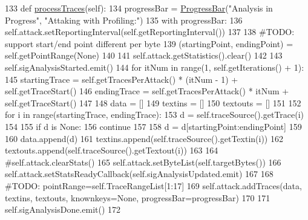 \begin{DoxyCode}
133     \textcolor{keyword}{def }\hyperlink{classsoftware_1_1chipwhisperer_1_1analyzer_1_1attacks_1_1profiling_1_1Profiling_a38c4ff6cc2be44c1f5656f866faa03d7}{processTraces}(self):
134         progressBar = \hyperlink{namespacesoftware_1_1chipwhisperer_1_1common_1_1ui_1_1ProgressBar_a378a399b50b3d116fc08a53eaa642148}{ProgressBar}(\textcolor{stringliteral}{"Analysis in Progress"}, \textcolor{stringliteral}{"Attaking with Profiling:"})
135         with progressBar:
136             self.attack.setReportingInterval(self.getReportingInterval())
137 
138             \textcolor{comment}{#TODO: support start/end point different per byte}
139             (startingPoint, endingPoint) = self.getPointRange(\textcolor{keywordtype}{None})
140 
141             self.attack.getStatistics().clear()
142 
143             self.sigAnalysisStarted.emit()
144             \textcolor{keywordflow}{for} itNum \textcolor{keywordflow}{in} range(1, self.getIterations() + 1):
145                 startingTrace = self.getTracesPerAttack() * (itNum - 1) + self.getTraceStart()
146                 endingTrace = self.getTracesPerAttack() * itNum + self.getTraceStart()
147 
148                 data = []
149                 textins = []
150                 textouts = []
151 
152                 \textcolor{keywordflow}{for} i \textcolor{keywordflow}{in} range(startingTrace, endingTrace):
153                     d = self.traceSource().getTrace(i)
154 
155                     \textcolor{keywordflow}{if} d \textcolor{keywordflow}{is} \textcolor{keywordtype}{None}:
156                         \textcolor{keywordflow}{continue}
157 
158                     d = d[startingPoint:endingPoint]
159 
160                     data.append(d)
161                     textins.append(self.traceSource().getTextin(i))
162                     textouts.append(self.traceSource().getTextout(i))
163 
164                 \textcolor{comment}{#self.attack.clearStats()}
165                 self.attack.setByteList(self.targetBytes())
166                 self.attack.setStatsReadyCallback(self.sigAnalysisUpdated.emit)
167 
168                 \textcolor{comment}{#TODO:  pointRange=self.TraceRangeList[1:17]}
169                 self.attack.addTraces(data, textins, textouts, knownkeys=\textcolor{keywordtype}{None}, progressBar=progressBar)
170 
171         self.sigAnalysisDone.emit()
172 
\end{DoxyCode}
\hypertarget{classsoftware_1_1chipwhisperer_1_1analyzer_1_1attacks_1_1profiling_1_1Profiling_a60f1ef9e385cd03d12214006f3160215}{}
